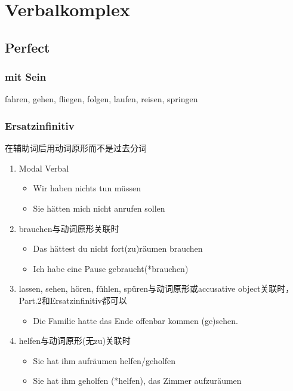 \documentclass[UTF8]{report}
\begin{document}
\section{Verbalkomplex}
\subsection{Perfect}
\subsubsection{mit Sein}
fahren, gehen, fliegen, folgen, laufen, reisen, springen

\subsubsection{Ersatzinfinitiv}
在辅助词后用动词原形而不是过去分词
\begin{enumerate}
    \item Modal Verbal
    \begin{itemize}
        \item Wir haben nichts tun müssen
        \item Sie hätten mich nicht anrufen sollen
    \end{itemize} 
    \item brauchen与动词原形关联时
    \begin{itemize}
        \item Das hättest du nicht fort(zu)räumen brauchen
        \item Ich habe eine Pause gebraucht(*brauchen)
    \end{itemize}
    \item lassen, sehen, hören, fühlen, spüren与动词原形或accusative object关联时，Part.2和Ersatzinfinitiv都可以
    \begin{itemize}
        \item Die Familie hatte das Ende offenbar kommen (ge)sehen.
    \end{itemize}
    \item helfen与动词原形(无zu)关联时
    \begin{itemize}
        \item Sie hat ihm aufräumen helfen/geholfen
        \item Sie hat ihm geholfen (*helfen), das Zimmer aufzuräumen
    \end{itemize}
\end{enumerate}
\end{document}
